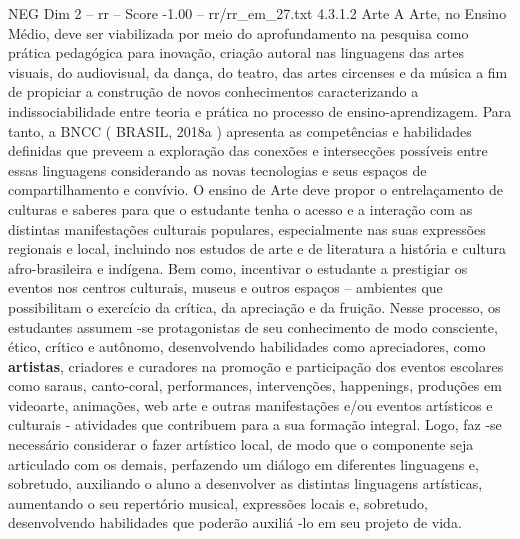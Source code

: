 \begin{textsample}{NEG Dim 2 – rr – Score -1.00 – rr/rr\_em\_27.txt}  \label{ex:f2_neg_186}
4.3.1.2 Arte A Arte, no Ensino Médio, deve ser viabilizada por meio do aprofundamento na pesquisa como prática pedagógica para inovação, criação autoral nas linguagens das artes visuais, do audiovisual, da dança, do teatro, das artes circenses e da música a fim de propiciar a construção de novos conhecimentos caracterizando a indissociabilidade entre teoria e prática no processo de ensino-aprendizagem.
Para tanto, a BNCC ( BRASIL, 2018a ) apresenta as competências e habilidades definidas que preveem a exploração das conexões e intersecções possíveis entre essas linguagens considerando as novas tecnologias e seus espaços de compartilhamento e convívio.
O ensino de Arte deve propor o entrelaçamento de culturas e saberes para que o estudante tenha o acesso e a interação com as distintas manifestações culturais populares, especialmente nas suas expressões regionais e local, incluindo nos estudos de arte e de literatura a história e cultura afro-brasileira e indígena.
Bem como, incentivar o estudante a prestigiar os eventos nos centros culturais, museus e outros espaços – ambientes que possibilitam o exercício da crítica, da apreciação e da fruição.
Nesse processo, os estudantes assumem -se protagonistas de seu conhecimento de modo consciente, ético, crítico e autônomo, desenvolvendo habilidades como apreciadores, como \textbf{artistas}, criadores e curadores na promoção e participação dos eventos escolares como saraus, canto-coral, performances, intervenções, happenings, produções em videoarte, animações, web arte e outras manifestações e/ou eventos artísticos e culturais - atividades que contribuem para a sua formação integral.
Logo, faz -se necessário considerar o fazer artístico local, de modo que o componente seja articulado com os demais, perfazendo um diálogo em diferentes linguagens e, sobretudo, auxiliando o aluno a desenvolver as distintas linguagens artísticas, aumentando o seu repertório musical, expressões locais e, sobretudo, desenvolvendo habilidades que poderão auxiliá -lo em seu projeto de vida.

\end{textsample}
